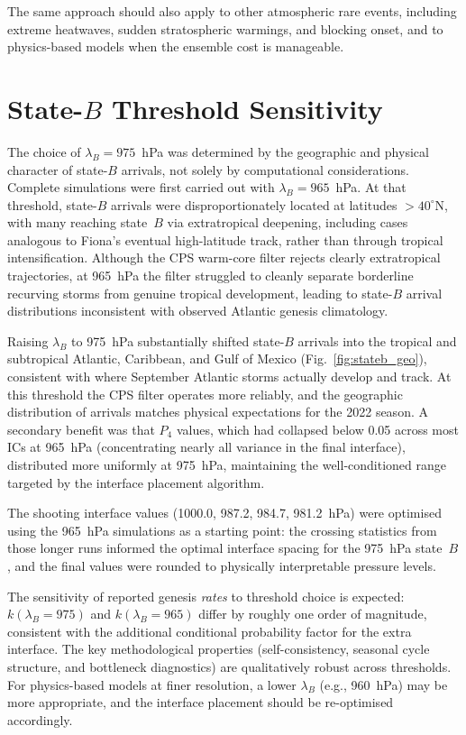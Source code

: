 \documentclass[11pt]{article}
\begin{document}
The same approach should also apply to other atmospheric rare events, including
extreme heatwaves, sudden stratospheric warmings, and blocking onset, and to
physics-based models when the ensemble cost is manageable.

\appendix
\section{State-$B$ Threshold Sensitivity}
\label{sec:si_threshold}

The choice of $\lambda_B = 975$~hPa was determined by the geographic and physical
character of state-$B$ arrivals, not solely by computational considerations.
Complete simulations were first carried out with $\lambda_B = 965$~hPa.
At that threshold, state-$B$ arrivals were disproportionately located at latitudes
$>40^\circ$N, with many reaching state~$B$ via extratropical deepening, including
cases analogous to Fiona's eventual high-latitude track, rather than through
tropical intensification.
Although the CPS warm-core filter rejects clearly extratropical trajectories,
at 965~hPa the filter struggled to cleanly separate borderline recurving storms
from genuine tropical development, leading to state-$B$ arrival distributions
inconsistent with observed Atlantic genesis climatology.

Raising $\lambda_B$ to 975~hPa substantially shifted state-$B$ arrivals into
the tropical and subtropical Atlantic, Caribbean, and Gulf of Mexico
(Fig.~\ref{fig:stateb_geo}), consistent with where September Atlantic storms
actually develop and track.
At this threshold the CPS filter operates more reliably, and the geographic
distribution of arrivals matches physical expectations for the 2022 season.
A secondary benefit was that $P_4$ values, which had collapsed below 0.05 across
most ICs at 965~hPa (concentrating nearly all variance in the final interface),
distributed more uniformly at 975~hPa, maintaining the well-conditioned range
targeted by the interface placement algorithm.

The shooting interface values (1000.0, 987.2, 984.7, 981.2~hPa) were optimised
using the 965~hPa simulations as a starting point: the crossing statistics from
those longer runs informed the optimal interface spacing for the 975~hPa state~$B$,
and the final values were rounded to physically interpretable pressure levels.

The sensitivity of reported genesis \textit{rates} to threshold choice is expected:
$k(\lambda_B = 975)$ and $k(\lambda_B = 965)$ differ by roughly one order of magnitude,
consistent with the additional conditional probability factor for the extra interface.
The key methodological properties (self-consistency, seasonal cycle structure,
and bottleneck diagnostics) are qualitatively robust across thresholds.
For physics-based models at finer resolution, a lower $\lambda_B$ (e.g., 960~hPa)
may be more appropriate, and the interface placement should be re-optimised accordingly.
\end{document}

